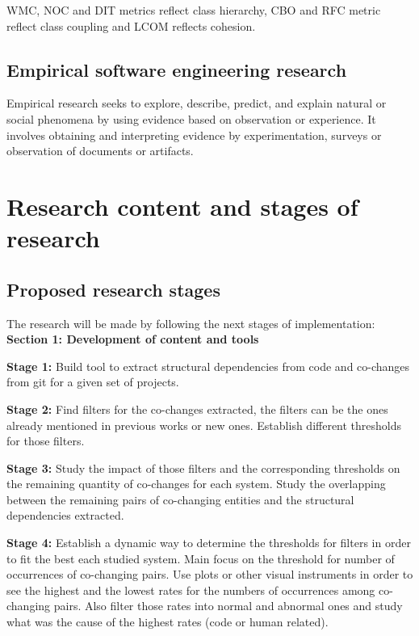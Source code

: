 \documentclass[12pt]{mitthesis}
\begin{document}
WMC, NOC and DIT metrics reflect class hierarchy, CBO and RFC metric reflect class coupling and LCOM reflects cohesion.



\section{Empirical software engineering research}
Empirical research seeks to explore, describe, predict, and explain natural or social phenomena by using evidence based on observation or experience.
It involves obtaining and interpreting evidence by experimentation, surveys or observation of documents or artifacts. \cite{inproceedingsEmpirical}



\chapter{Research content and stages of research}

\section{Proposed research stages}
The research will be made by following the next stages of implementation:\\

\textbf{Section 1:  Development of content and tools}

\textbf{Stage 1:} Build tool to extract structural dependencies from code and co-changes from git for a given set of projects.

\textbf{Stage 2:} Find filters for the co-changes extracted, the filters can be the ones already mentioned in previous works or new ones. Establish different thresholds for those filters.

\textbf{Stage 3:} Study the impact of those filters and the corresponding thresholds on the remaining quantity of co-changes for each system.
Study the overlapping between the remaining pairs of co-changing entities and the structural dependencies extracted. \cite{enase19}

\textbf{Stage 4:} Establish a dynamic way to determine the thresholds for filters in order to fit the best each studied system. Main focus on the threshold for number of occurrences of co-changing pairs.
Use plots or other visual instruments in order to see the highest and the lowest rates for the numbers of occurrences among co-changing pairs.
Also filter those rates into normal and abnormal ones and study what was the cause of the highest rates (code or human related).
\end{document}
